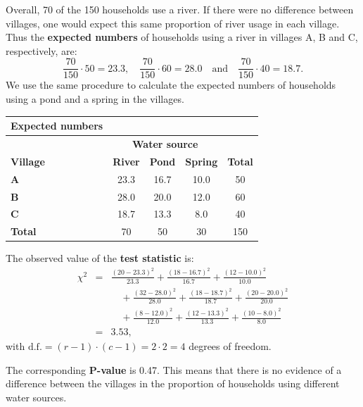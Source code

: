 \documentclass[compress, notes=hide]{beamer}
\newcommand{\hl}[1]{\textbf{#1}}
\begin{document}
\begin{frame}
\begin{block}{}
  Overall, 70 of the 150 households use a river. If there were no
  difference between villages, one would expect this same proportion
  of river usage in each village. Thus the \hl{expected numbers} of
  households using a river in villages A, B and C, respectively, are:
\begin{equation*}
\frac{70}{150} \cdot 50 = 23.3, \quad \frac{70}{150} \cdot 60 = 28.0 \quad \text{and} \quad \frac{70}{150} \cdot 40 = 18.7.
\end{equation*}
We use the same procedure to calculate the expected numbers of
households using a pond and a spring in the villages.
\begin{table}
\begin{tiny}
\begin{tabular}{lcccc}
Expected numbers & & & &
\\
\hline
& \multicolumn{3}{c}{\textbf{Water source}} &
\\
\cline{2-4}
\textbf{Village} & \textbf{River} & \textbf{Pond} & \textbf{Spring} & \textbf{Total}
\\
\hline
\textbf{A} & 23.3 & 16.7 & 10.0 & 50
\\
\textbf{B} & 28.0 & 20.0 & 12.0 & 60
\\
\textbf{C} & 18.7 & 13.3 & 8.0 & 40
\\
\hline
\textbf{Total} & 70 & 50 & 30 & 150
\\
\hline
\end{tabular}
\end{tiny}
\end{table}
\end{block}
\end{frame}

\begin{frame}
\begin{block}{}
The observed value of the \hl{test statistic} is:
\begin{eqnarray*}
\chi^2 & = & \frac{(20 - 23.3)^2}{23.3} + \frac{(18 - 16.7)^2}{16.7} + \frac{(12 - 10.0)^2}{10.0} \\
& & \quad + \frac{(32 - 28.0)^2}{28.0} + \frac{(18 - 18.7)^2}{18.7} + \frac{(20 - 20.0)^2}{20.0}  \\
& & \quad + \frac{(8 - 12.0)^2}{12.0} + \frac{(12 - 13.3)^2}{13.3} + \frac{(10 - 8.0)^2}{8.0} \\
& = & 3.53,
\end{eqnarray*}
with $\mathrm{d.f.}=(r - 1) \cdot (c - 1) = 2 \cdot 2 = 4$ degrees of freedom.
\end{block}

\begin{block}{}
  The corresponding \hl{$\bm{P}$-value} is
  0.47. This means that there is no evidence of a difference between
  the villages in the proportion of households using different water
  sources.
\end{block}

\end{frame}
\end{document}
